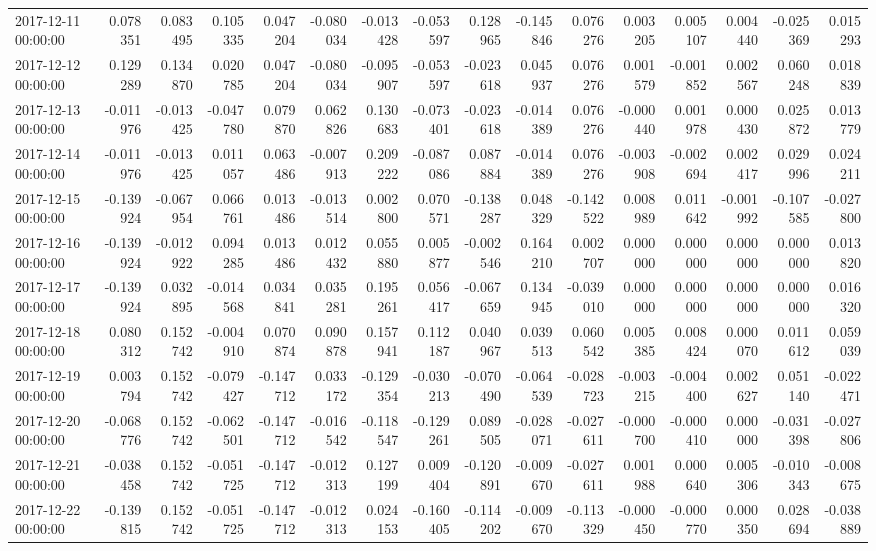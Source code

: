 \begin{tabular}{lrrrrrrrrrrrrrrr}
2017-12-11 00:00:00 & 0.078351 & 0.083495 & 0.105335 & 0.047204 & -0.080034 & -0.013428 & -0.053597 & 0.128965 & -0.145846 & 0.076276 & 0.003205 & 0.005107 & 0.004440 & -0.025369 & 0.015293 \\
2017-12-12 00:00:00 & 0.129289 & 0.134870 & 0.020785 & 0.047204 & -0.080034 & -0.095907 & -0.053597 & -0.023618 & 0.045937 & 0.076276 & 0.001579 & -0.001852 & 0.002567 & 0.060248 & 0.018839 \\
2017-12-13 00:00:00 & -0.011976 & -0.013425 & -0.047780 & 0.079870 & 0.062826 & 0.130683 & -0.073401 & -0.023618 & -0.014389 & 0.076276 & -0.000440 & 0.001978 & 0.000430 & 0.025872 & 0.013779 \\
2017-12-14 00:00:00 & -0.011976 & -0.013425 & 0.011057 & 0.063486 & -0.007913 & 0.209222 & -0.087086 & 0.087884 & -0.014389 & 0.076276 & -0.003908 & -0.002694 & 0.002417 & 0.029996 & 0.024211 \\
2017-12-15 00:00:00 & -0.139924 & -0.067954 & 0.066761 & 0.013486 & -0.013514 & 0.002800 & 0.070571 & -0.138287 & 0.048329 & -0.142522 & 0.008989 & 0.011642 & -0.001992 & -0.107585 & -0.027800 \\
2017-12-16 00:00:00 & -0.139924 & -0.012922 & 0.094285 & 0.013486 & 0.012432 & 0.055880 & 0.005877 & -0.002546 & 0.164210 & 0.002707 & 0.000000 & 0.000000 & 0.000000 & 0.000000 & 0.013820 \\
2017-12-17 00:00:00 & -0.139924 & 0.032895 & -0.014568 & 0.034841 & 0.035281 & 0.195261 & 0.056417 & -0.067659 & 0.134945 & -0.039010 & 0.000000 & 0.000000 & 0.000000 & 0.000000 & 0.016320 \\
2017-12-18 00:00:00 & 0.080312 & 0.152742 & -0.004910 & 0.070874 & 0.090878 & 0.157941 & 0.112187 & 0.040967 & 0.039513 & 0.060542 & 0.005385 & 0.008424 & 0.000070 & 0.011612 & 0.059039 \\
2017-12-19 00:00:00 & 0.003794 & 0.152742 & -0.079427 & -0.147712 & 0.033172 & -0.129354 & -0.030213 & -0.070490 & -0.064539 & -0.028723 & -0.003215 & -0.004400 & 0.002627 & 0.051140 & -0.022471 \\
2017-12-20 00:00:00 & -0.068776 & 0.152742 & -0.062501 & -0.147712 & -0.016542 & -0.118547 & -0.129261 & 0.089505 & -0.028071 & -0.027611 & -0.000700 & -0.000410 & 0.000000 & -0.031398 & -0.027806 \\
2017-12-21 00:00:00 & -0.038458 & 0.152742 & -0.051725 & -0.147712 & -0.012313 & 0.127199 & 0.009404 & -0.120891 & -0.009670 & -0.027611 & 0.001988 & 0.000640 & 0.005306 & -0.010343 & -0.008675 \\
2017-12-22 00:00:00 & -0.139815 & 0.152742 & -0.051725 & -0.147712 & -0.012313 & 0.024153 & -0.160405 & -0.114202 & -0.009670 & -0.113329 & -0.000450 & -0.000770 & 0.000350 & 0.028694 & -0.038889 \\

\end{tabular}
